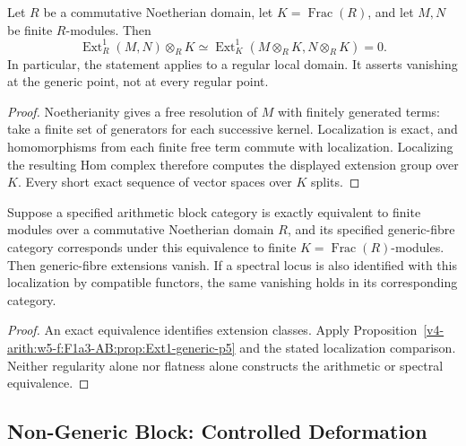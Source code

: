\begin{proposition}
\label{v4-arith:w5-f:F1a3-AB:prop:Ext1-generic-p5}
Let \(R\) be a commutative Noetherian domain, let
\(K=\operatorname{Frac}(R)\), and let \(M,N\) be finite \(R\)-modules.
Then
\[
 \operatorname{Ext}^1_R(M,N)\otimes_R K
 \simeq\operatorname{Ext}^1_K(M\otimes_R K,N\otimes_R K)=0.
\]
In particular, the statement applies to a regular local domain.
It asserts vanishing at the generic point, not at every regular point.
\end{proposition}
\begin{proof}
Noetherianity gives a free resolution of \(M\) with finitely generated
terms: take a finite set of generators for each successive kernel.
Localization is exact, and homomorphisms from each finite free term
commute with localization. Localizing the resulting Hom complex
therefore computes the displayed extension group over \(K\).
Every short exact sequence of vector spaces over \(K\) splits.
\end{proof}

\begin{corollary}
\label{v4-arith:w5-f:F1a3-AB:cor:Ext1-zero-generic-locus}
Suppose a specified arithmetic block category is exactly equivalent
to finite modules over a commutative Noetherian domain \(R\), and
its specified generic-fibre category corresponds under this equivalence
to finite \(K=\operatorname{Frac}(R)\)-modules.
Then generic-fibre extensions vanish. If a spectral locus is also
identified with this localization by compatible functors, the same
vanishing holds in its corresponding category.
\end{corollary}
\begin{proof}
An exact equivalence identifies extension classes. Apply
Proposition~\ref{v4-arith:w5-f:F1a3-AB:prop:Ext1-generic-p5}
and the stated localization comparison. Neither regularity alone
nor flatness alone constructs the arithmetic or spectral equivalence.
\end{proof}

\subsection{Non-Generic Block: Controlled Deformation}

